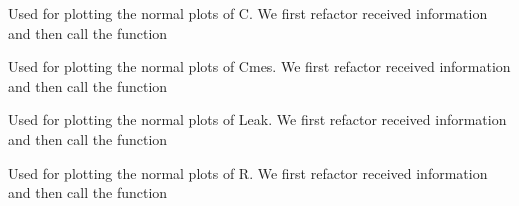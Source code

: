 \documentclass[letterpaper,10pt,english]{sphinxmanual}
\begin{document}
\begin{fulllineitems}
\label{\detokenize{app:app.C_normal}}
\pysigstartsignatures
{}
\pysigstopsignatures
\sphinxAtStartPar
Used for plotting the normal plots of C.
We first refactor received information and then call the function

\end{fulllineitems}


\begin{fulllineitems}
\label{\detokenize{app:app.Cmes_normal}}
\pysigstartsignatures
{}
\pysigstopsignatures
\sphinxAtStartPar
Used for plotting the normal plots of Cmes.
We first refactor received information and then call the function

\end{fulllineitems}


\begin{fulllineitems}
\label{\detokenize{app:app.Leak_normal}}
\pysigstartsignatures
{}
\pysigstopsignatures
\sphinxAtStartPar
Used for plotting the normal plots of Leak.
We first refactor received information and then call the function

\end{fulllineitems}


\begin{fulllineitems}
\label{\detokenize{app:app.R_normal}}
\pysigstartsignatures
{}
\pysigstopsignatures
\sphinxAtStartPar
Used for plotting the normal plots of R.
We first refactor received information and then call the function

\end{fulllineitems}
\end{document}
